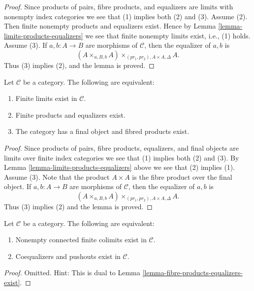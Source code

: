 \begin{proof}
Since products of pairs, fibre products, and equalizers are limits with
nonempty index categories we see that (1) implies both (2) and (3).
Assume (2). Then finite nonempty products and equalizers exist. Hence by
Lemma \ref{lemma-limits-products-equalizers}
we see that finite nonempty limits exist, i.e., (1) holds. Assume (3).
If $a, b : A \to B$ are morphisms of $\mathcal{C}$, then the
equalizer of $a, b$ is
$$
(A \times_{a, B, b} A)\times_{(pr_1, pr_2), A \times A, \Delta} A.
$$
Thus (3) implies (2), and the lemma is proved.
\end{proof}

\begin{lemma}
\label{lemma-finite-limits-exist}
Let $\mathcal{C}$ be a category.
The following are equivalent:
\begin{enumerate}
\item Finite limits exist in $\mathcal{C}$.
\item Finite products and equalizers exist.
\item The category has a final object and fibred products exist.
\end{enumerate}
\end{lemma}

\begin{proof}
Since products of pairs, fibre products, equalizers, and final objects
are limits over finite index categories we see that (1) implies both (2)
and (3). By
Lemma \ref{lemma-limits-products-equalizers}
above we see that (2) implies (1). Assume (3).
Note that the product $A \times A$ is the fibre product over the
final object. If $a, b : A \to B$ are morphisms of $\mathcal{C}$, then the
equalizer of $a, b$ is
$$
(A \times_{a, B, b} A)\times_{(pr_1, pr_2), A \times A, \Delta} A.
$$
Thus (3) implies (2) and the lemma is proved.
\end{proof}

\begin{lemma}
\label{lemma-push-outs-coequalizers-exist}
Let $\mathcal{C}$ be a category.
The following are equivalent:
\begin{enumerate}
\item Nonempty connected finite colimits exist in $\mathcal{C}$.
\item Coequalizers and pushouts exist in $\mathcal{C}$.
\end{enumerate}
\end{lemma}

\begin{proof}
Omitted. Hint: This is dual to
Lemma \ref{lemma-fibre-products-equalizers-exist}.
\end{proof}

